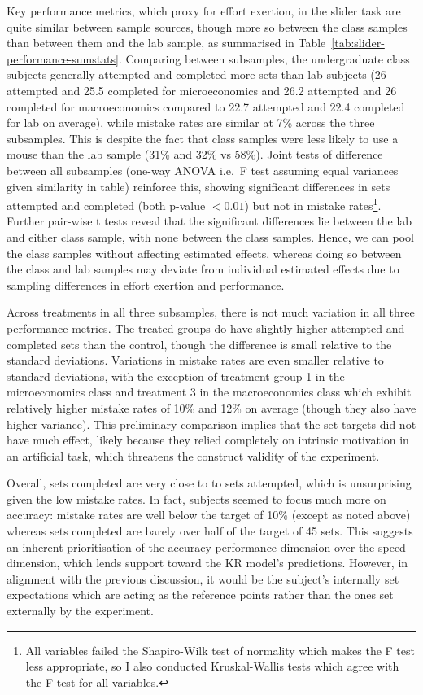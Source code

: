 \documentclass[12pt, letterpaper]{article}
\begin{document}
Key performance metrics, which proxy for effort exertion, in the slider task are quite similar between sample sources, though more so between the class samples than between them and the lab sample, as summarised in Table~\ref{tab:slider-performance-sumstats}. Comparing between subsamples, the undergraduate class subjects generally attempted and completed more sets than lab subjects (26 attempted and 25.5 completed for microeconomics and 26.2 attempted and 26 completed for macroeconomics compared to 22.7 attempted and 22.4 completed for lab on average), while mistake rates are similar at 7\% across the three subsamples. This is despite the fact that class samples were less likely to use a mouse than the lab sample (31\% and 32\% vs 58\%). Joint tests of difference between all subsamples (one-way ANOVA i.e.~F test assuming equal variances given similarity in table) reinforce this, showing significant differences in sets attempted and completed (both p-value $< 0.01$) but not in mistake rates\footnote{All variables failed the Shapiro-Wilk test of normality which makes the F test less appropriate, so I also conducted Kruskal-Wallis tests which agree with the F test for all variables.}. Further pair-wise t tests reveal that the significant differences lie between the lab and either class sample, with none between the class samples. Hence, we can pool the class samples without affecting estimated effects, whereas doing so between the class and lab samples may deviate from individual estimated effects due to sampling differences in effort exertion and performance.

Across treatments in all three subsamples, there is not much variation in all three performance metrics. The treated groups do have slightly higher attempted and completed sets than the control, though the difference is small relative to the standard deviations. Variations in mistake rates are even smaller relative to standard deviations, with the exception of treatment group 1 in the microeconomics class and treatment 3 in the macroeconomics class which exhibit relatively higher mistake rates of 10\% and 12\% on average (though they also have higher variance). This preliminary comparison implies that the set targets did not have much effect, likely because they relied completely on intrinsic motivation in an artificial task, which threatens the construct validity of the experiment.

Overall, sets completed are very close to to sets attempted, which is unsurprising given the low mistake rates. In fact, subjects seemed to focus much more on accuracy: mistake rates are well below the target of 10\% (except as noted above) whereas sets completed are barely over half of the target of 45 sets. This suggests an inherent prioritisation of the accuracy performance dimension over the speed dimension, which lends support toward the KR model's predictions. However, in alignment with the previous discussion, it would be the subject's internally set expectations which are acting as the reference points rather than the ones set externally by the experiment.
\end{document}
